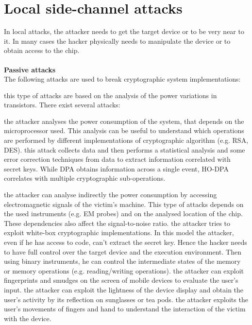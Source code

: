 \section{Local side-channel attacks}
In local attacks, the attacker needs to get the target device or to be very near to it. In many cases the hacker physically needs to manipulate the device or to obtain access to the chip.\\\\
\textbf{Passive attacks}\\
The following attacks are used to break cryptographic system implementations:
\begin{itemize}
{this type of attacks are based on the analysis of the power variations in transistors. There exist several attacks\cite{intro_DPA}:
\begin{itemize}
{the attacker analyses the power consumption of the system, that depends on the microprocessor used. This analysis can be useful to understand which operations are performed by different implementations of cryptographic algorithm (e.g. RSA, DES).}
{this attack collects data and then performs a statistical analysis and some error correction techniques from data to extract information correlated with secret keys.}
{While DPA obtains information across a single event, HO-DPA correlates with multiple cryptographic sub-operations.}
\end{itemize}}
{the attacker can analyse indirectly the power consumption by accessing electromagnetic signals of the victim's machine. This type of attacks depends on the used instruments (e.g. EM probes) and on the analysed location of the chip. These dependencies also affect the signal-to-noise ratio.}
{the attacker tries to exploit white-box cryptographic implementations. In this model the attacker, even if he has access to code, can't extract the secret key. Hence the hacker needs to have full control over the target device and the execution environment. Then using binary instruments, he can control the intermediate states of the memory or memory operations (e.g. reading/writing operations)\cite{side_DCA}.}
{the attacker can exploit fingerprints and smudges on the screen of mobile devices to evaluate the user's input.}
{the attacker can exploit the lightness of the device display and obtain the user's activity by its reflection on sunglasses or tea pods.}
{the attacker exploits the user's movements of fingers and hand to understand the interaction of the victim with the device.}
\end{itemize}
